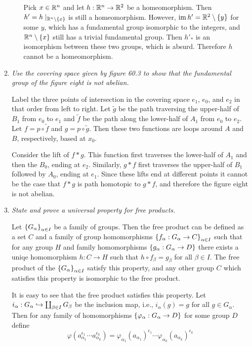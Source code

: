 \documentclass[10pt]{article}
\begin{document}
\begin{enumerate}
\begin{enumerate}
Pick $x \in \mathbb{R}^n$ and let $h: \mathbb{R}^n \rightarrow \mathbb{R}^2$ be a homeomorphism.  Then $h' = h\mid_{\mathbb{R}^n \setminus \left\{ x \right\}}$ is still a homeomorphism.  However, $\operatorname{im} h' = \mathbb{R}^2 \setminus \left\{ y \right\}$ for some $y$, which has a fundamental group isomorphic to the integers, and $\mathbb{R}^n \setminus \left\{ x \right\}$ still has a trivial fundamental group.  Then $h'_\ast$ is an isomorphism between these two groups, which is absurd.  Therefore $h$ cannot be a homeomorphism.
\end{enumerate}

\item \emph{Use the covering space given by figure 60.3 to show that the fundamental group of the figure eight is not abelian.}

Label the three points of intersection in the covering space $e_1$, $e_0$, and $e_2$ in that order from left to right.  Let $\tilde{g}$ be the path traversing the upper-half of $B_1$ from $e_0$ to $e_1$ and $\tilde{f}$ be the path along the lower-half of $A_1$ from $e_0$ to $e_2$.  Let $f = p \circ \tilde{f}$ and $g = p \circ \tilde{g}$.  Then these two functions are loops around $A$ and $B$, respectively, based at $x_0$.

Consider the lift of $f \ast g$.  This function first traverses the lower-half of $A_1$ and then the $B_0$, ending at $e_2$.  Similarly, $g \ast f$ first traverses the upper-half of $B_1$ followed by $A_0$, ending at $e_1$.  Since these lifts end at different points it cannot be the case that $f \ast g$ is path homotopic to $g \ast f$, and therefore the figure eight is not abelian. 

\item \emph{State and prove a universal property for free products.}

Let $\left\{ G_\alpha \right\}_{\alpha \in I}$ be a family of groups.  Then the free product can be defined as a set $C$ and a family of group homomorphisms $\left\{ f_\alpha: G_\alpha \rightarrow C \right\}_{\alpha \in I}$ such that for any group $H$ and family homomorphisms $\left\{ g_\alpha: G_\alpha \rightarrow D \right\}$ there exists a uniqe homomorphism $h: C \rightarrow H$ such that $h \circ f_\beta = g_\beta$ for all $\beta \in I$.  The free product of the $\left\{ G_\alpha \right\}_{\alpha \in I}$ satisfy this property, and any other group $C$ which satisfies this property is isomorphic to the free product.

It is easy to see that the free product satisfies this property.  Let $i_\alpha: G_\alpha \hookrightarrow \coprod_{\beta \in I} G_\beta$ be the inclusion map, i.e., $i_\alpha(g) = g$ for all $g \in G_\alpha$.  Then for any family of homomorphisms $\left\{ \varphi_\alpha: G_\alpha \rightarrow D \right\}$ for some group $D$ define
\[
\varphi\left(a_{\alpha_1}^{\epsilon_1} \cdots a_{\alpha_k}^{\epsilon_k}\right) = \varphi_{\alpha_1}\left(a_{\alpha_1}\right)^{\epsilon_1} \cdots \varphi_{\alpha_k}\left(a_{\alpha_k}\right)^{\epsilon_k}
\]


\end{enumerate}
\end{document}
